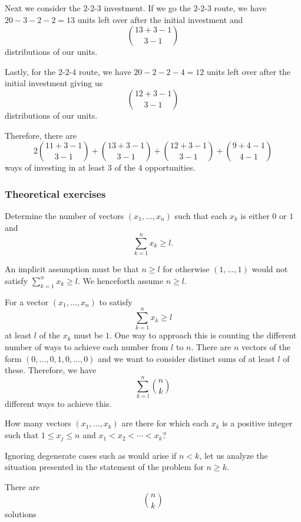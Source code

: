 \begin{solution*}
  Next we consider the \(2\)-\(2\)-\(3\) investment. If we go the
  \(2\)-\(2\)-\(3\) route, we have \(20-3-2-2=13\) units left over after
  the initial investment and
  \[
    \binom{13+3-1}{3-1}
  \]
  distributions of our units.

  Lastly, for the \(2\)-\(2\)-\(4\) route, we have \(20-2-2-4=12\) units
  left over after the initial investment giving us
  \[
    \binom{12+3-1}{3-1}
  \]
  distributions of our units.

  Therefore, there are
  \[
    2\binom{11+3-1}{3-1}
    +\binom{13+3-1}{3-1}
    +\binom{12+3-1}{3-1}
    +\binom{9+4-1}{4-1}
  \]
  ways of investing in at least \(3\) of the \(4\) opportunities.
\end{solution*}

\subsubsection{Theoretical exercises}
\begin{problem}[Ross, \S 1, \# 5]
  Determine the number of vectors \((x_1,\dotsc,x_n)\) such that each
  \(x_k\) is either \(0\) or \(1\) and
  \[
    \sum_{k=1}^n x_k\geq l.
  \]
\end{problem}
\begin{solution*}
  An implicit assumption must be that \(n\geq l\) for otherwise
  \((1,\dotsc,1)\) would not satisfy \(\sum_{k=1}^n x_k\geq l\). We
  henceforth assume \(n\geq l\).

  For a vector \((x_1,\dotsc,x_n)\) to satisfy
  \[
    \sum_{k=1}^n x_k\geq l
  \]
  at least \(l\) of the \(x_k\) must be \(1\). One way to approach this is
  counting the different number of ways to achieve each number from \(l\)
  to \(n\). There are \(n\) vectors of the form
  \((0,\dotsc,0,1,0,\dotsc,0)\) and we want to consider distinct sums of at
  least \(l\) of these. Therefore, we have
  \[
    \sum_{k=l}^n\binom{n}{k}
  \]
  different ways to achieve this.
\end{solution*}

\begin{problem}[Ross, \S 1, \# 6]
  How many vectors \((x_1,\dotsc,x_k)\) are there for which each \(x_k\) is a
  positive integer such that \(1\leq x_j\leq n\) and
  \(x_1<x_2<\dotsb<x_k\)?
\end{problem}
\begin{solution*}
  Ignoring degenerate cases such as would arise if \(n<k\), let us analyze
  the situation presented in the statement of the problem for \(n\geq k\).

  There are
  \[
    \binom{n}{k}
  \]
  solutions
\end{solution*}

